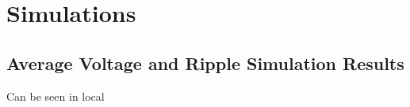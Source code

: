 \chapter{Simulations}

\section{Average Voltage and Ripple Simulation Results}
\label{sec:ripplesimulation}

Can be seen in local
